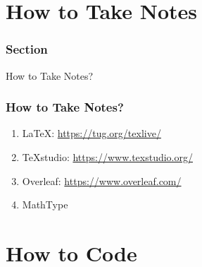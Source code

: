 \documentclass[aspectratio=2516]{beamer}
\begin{document}
\section{How to Take Notes}

\begin{frame}
	\frametitle{ Section \uppercase\expandafter{}}
	
	\begin{center}
		\Large How to Take Notes?
	\end{center}
	
\end{frame}

\begin{frame}
	\frametitle{How to Take Notes?}
	\begin{enumerate}
		
		\item \LaTeX: {\color{blue} \url{https://tug.org/texlive/}}
		
		\vspace{0.75cm}
		
		\item TeXstudio: {\color{blue} \url{https://www.texstudio.org/}}
		
		\vspace{0.75cm}
		
		\item Overleaf: {\color{blue} \url{https://www.overleaf.com/}}
		
		\vspace{0.75cm}
		
		\item MathType
		
	\end{enumerate}
\end{frame}


\section{How to Code}
\end{document}
